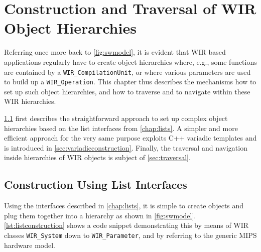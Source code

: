 \chapter{Construction and Traversal of WIR Object Hierarchies}
\label{chap:construction}
\renewcommand{\sectiontitle}{}

Referring once more back to \cref{fig:swmodel}, it is evident that \gls{WIR} based applications regularly have to create object hierarchies where, e.g., some functions are contained by a \texttt{WIR\_CompilationUnit}, or where various parameters are used to build up a \texttt{WIR\_Operation}.
This chapter thus describes the mechanisms how to set up such object hierarchies, and how to traverse and to navigate within these \gls{WIR} hierarchies.

\cref{sec:listconstruction} first describes the straightforward approach to set up complex object hierarchies based on the list interfaces from \cref{chap:lists}.
A simpler and more efficient approach for the very same purpose exploits C++ variadic templates and is introduced in \cref{sec:variadicconstruction}.
Finally, the traversal and navigation inside hierarchies of \gls{WIR} objects is subject of \cref{sec:traversal}.


\section{Construction Using List Interfaces}
\label{sec:listconstruction}

Using the interfaces described in \cref{chap:lists}, it is simple to create objects and plug them together into a hierarchy as shown in \cref{fig:swmodel}.
\cref{lst:listconstruction} shows a code snippet demonstrating this by means of \gls{WIR} classes \texttt{WIR\_System} down to \texttt{WIR\_Parameter}, and by referring to the generic MIPS hardware model.

